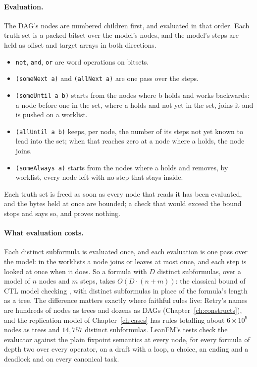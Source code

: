 \paragraph{Evaluation.} The DAG's nodes are numbered children first, and evaluated in
that order. Each truth set is a packed bitset over the model's nodes, and the model's
steps are held as offset and target arrays in both directions.
\begin{itemize}
\item \texttt{not}, \texttt{and}, \texttt{or} are word operations on bitsets.
\item \texttt{(someNext a)} and \texttt{(allNext a)} are one pass over the steps.
\item \texttt{(someUntil a b)} starts from the nodes where b holds and works
  backwards: a node before one in the set, where a holds and not yet in the set, joins it
  and is pushed on a worklist.
\item \texttt{(allUntil a b)} keeps, per node, the number of its steps not yet known to
  lead into the set; when that reaches zero at a node where a holds, the node joins.
\item \texttt{(someAlways a)} starts from the nodes where a holds and removes, by
  worklist, every node left with no step that stays inside.
\end{itemize}
Each truth set is freed as soon as every node that reads it has been evaluated, and the
bytes held at once are bounded; a check that would exceed the bound stops and says so,
and proves nothing.

\paragraph{What evaluation costs.}\label{thm:eval} Each distinct subformula is
evaluated once, and each evaluation is one pass over the model: in the worklists a node
joins or leaves at most once, and each step is looked at once when it does. So a formula
with $D$ distinct subformulas, over a model of $n$ nodes and $m$ steps, takes
$O(D \cdot (n + m))$: the classical bound of CTL model checking
\citep{clarke1986automatic}, with distinct subformulas in place of the formula's length as
a tree. The difference matters exactly where faithful
rules live: Retry's names are hundreds of nodes as trees and dozens as DAGs
(Chapter~\ref{ch:constructs}), and the replication model of
Chapter~\ref{ch:cases} has rules totalling about $6\times 10^9$ nodes as trees and
$14{,}757$ distinct subformulas. LeanFM's tests check the evaluator against the plain fixpoint
semantics at every node, for every formula of depth two over every operator, on a
draft with a loop, a choice, an ending and a deadlock and on every canonical task.

